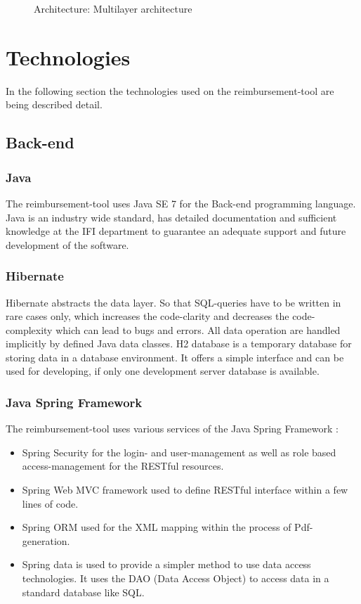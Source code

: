 \begin{figure}[H]
    \centering
    \caption{Architecture: Multilayer architecture}
    \label{fig:architecture-layer}
\end{figure}

\section{Technologies}

In the following section the technologies used on the reimbursement-tool are being described detail.

\subsection{Back-end}

\subsubsection{Java}
The reimbursement-tool uses Java SE 7 for the Back-end programming language. Java is an industry wide standard, has detailed documentation and sufficient knowledge at the IFI \cite{ifi} department to guarantee an adequate support and future development of the software.

\subsubsection{Hibernate}
Hibernate abstracts the data layer. So that SQL-queries have to be written in rare cases only, which increases the code-clarity and decreases the code-complexity which can lead to bugs and errors. All data operation are handled implicitly by defined Java data classes.\newline
H2 database is a temporary database for storing data in a database environment. It offers a simple interface and can be used for developing, if only one development server database is available. \cite{hibernate}

\subsubsection{Java Spring Framework}
The reimbursement-tool uses various services of the Java Spring Framework \cite{spring}:
\begin{itemize}
    \item Spring Security for the login- and user-management as well as role based access-management for the RESTful resources.
    \item Spring Web MVC framework used to define RESTful interface within a few lines of code.
    \item Spring ORM used for the XML mapping within the process of Pdf-generation.
    \item Spring data is used to provide a simpler method to use data access technologies. It uses the DAO (Data Access Object) \cite{dao} to access data in a standard database like SQL. 
\end{itemize}

